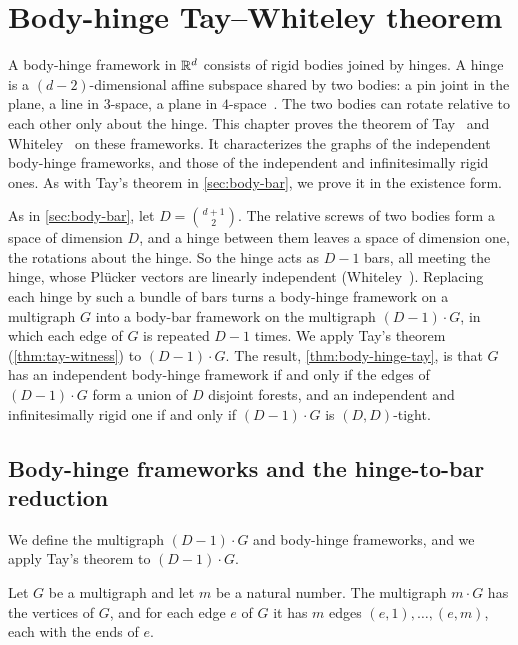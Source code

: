\section{Body-hinge Tay--Whiteley theorem}
\label{sec:body-hinge}

A body-hinge framework in ${\mathbb{R}}^d$ consists of rigid bodies joined by
hinges. A hinge is a $(d-2)$-dimensional affine subspace shared by two
bodies: a pin joint in the plane, a line in $3$-space, a plane in
$4$-space~\cite[\S3.3]{whiteley1988}. The two bodies can rotate
relative to each other only about the hinge. This chapter proves the
theorem of Tay~\cite{tay1989} and Whiteley~\cite{whiteley1988} on these
frameworks. It characterizes the graphs of the independent body-hinge
frameworks, and those of the independent and infinitesimally rigid
ones. As with Tay's theorem in \cref{sec:body-bar}, we prove it in the
existence form.

As in \cref{sec:body-bar}, let $D = \binom{d+1}{2}$. The relative
screws of two bodies form a space of dimension $D$, and a hinge between
them leaves a space of dimension one, the rotations about the hinge. So
the hinge acts as $D - 1$ bars, all meeting the hinge, whose Pl\"ucker
vectors are linearly independent (Whiteley~\cite[proof of
Theorem~10]{whiteley1988}). Replacing each hinge by such a bundle of
bars turns a body-hinge framework on a multigraph $G$ into a body-bar
framework on the multigraph $(D-1)\cdot G$, in which each edge of $G$
is repeated $D - 1$ times. We apply Tay's theorem
(\cref{thm:tay-witness}) to $(D-1)\cdot G$. The result,
\cref{thm:body-hinge-tay}, is that $G$ has an independent body-hinge
framework if and only if the edges of $(D-1)\cdot G$ form a union of
$D$ disjoint forests, and an independent and infinitesimally rigid one
if and only if $(D-1)\cdot G$ is $(D, D)$-tight.

\subsection{Body-hinge frameworks and the hinge-to-bar reduction}
\label{sec:body-hinge-reduction}

We define the multigraph $(D-1)\cdot G$ and body-hinge frameworks, and
we apply Tay's theorem to $(D-1)\cdot G$.

\begin{definition}
  \label{def:edge-multiply}
  \leanok
  Let $G$ be a multigraph and let $m$ be a natural number. The
  multigraph $m \cdot G$ has the vertices of $G$, and for each edge $e$
  of $G$ it has $m$ edges $(e, 1), \dots, (e, m)$, each with the ends of
  $e$.
\end{definition}

